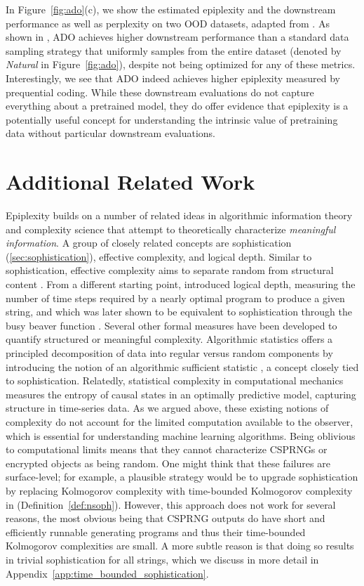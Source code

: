 \documentclass[twoside]{article}
\newcommand{\soph}[1]{epiplexity}
\begin{document}
In Figure~\ref{fig:ado}(c), we show the estimated \soph{} and the downstream performance as well as perplexity on two OOD datasets, adapted from \citet{jiang2025adaptive}.
As shown in \citet{jiang2025adaptive}, ADO achieves higher downstream performance than a standard data sampling strategy that uniformly samples from the entire dataset (denoted by \emph{Natural} in Figure~\ref{fig:ado}), despite not being optimized for any of these metrics.
Interestingly, we see that ADO indeed achieves higher epiplexity measured by prequential coding. 
While these downstream evaluations do not capture everything about a pretrained model, they do offer evidence that epiplexity is a potentially useful concept for understanding the intrinsic value of pretraining data without particular downstream evaluations.
%
%
%

\section{Additional Related Work}
Epiplexity builds on a number of related ideas in algorithmic information theory and complexity science that attempt to theoretically characterize \emph{meaningful information}. 
A group of closely related concepts are sophistication (\autoref{sec:sophistication}), effective complexity, and logical depth. Similar to sophistication, effective complexity aims to separate random from structural content \citep{gell1996information}. From a different starting point, \citet{bennett1988logical} introduced logical depth, measuring the number of time steps required by a nearly optimal program to produce a given string, and which was later shown to be equivalent to sophistication through the busy beaver function \citep{antunes2006sophistication,ay2010effective}. Several other formal measures have been developed to quantify structured or meaningful complexity. Algorithmic statistics offers a principled decomposition of data into regular versus random components by introducing the notion of an algorithmic sufficient statistic \citep{vereshchagin2004kolmogorov}, a concept closely tied to sophistication. Relatedly, statistical complexity in computational mechanics \citep{shalizi2001computational} measures the entropy of causal states in an optimally predictive model, capturing structure in time-series data. As we argued above, these existing notions of complexity do not account for the limited computation available to the observer, which is essential for understanding machine learning algorithms.
Being oblivious to computational limits means that they cannot characterize CSPRNGs or encrypted objects as being random. One might think that these failures are surface-level; for example, a plausible strategy would be to upgrade sophistication by replacing Kolmogorov complexity with time-bounded Kolmogorov complexity in (Definition~\ref{def:nsoph}). However, this approach does not work for several reasons, the most obvious being that CSPRNG outputs do have short and efficiently runnable generating programs and thus their time-bounded Kolmogorov complexities are small.
A more subtle reason is that doing so results in trivial sophistication for all strings, which we discuss in more detail in Appendix~\ref{app:time_bounded_sophistication}.
%
\end{document}
